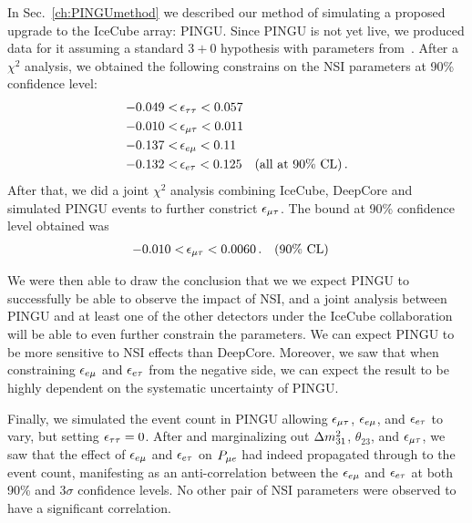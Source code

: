 In Sec.~\ref{ch:PINGUmethod} we described our method of simulating a proposed upgrade to the IceCube array: PINGU.
Since PINGU is not yet live, we produced data for it assuming a standard $3+0$ hypothesis with parameters from~\cite{nufit}.
After a $\chi^2$ analysis, we obtained the following constrains on the NSI parameters at 90\% confidence level:
\begin{align}
    -0.049 <&\, \epsilon_{\tau\tau} < 0.057 \nonumber \\
    -0.010 <&\, \epsilon_{\mu\tau} < 0.011 \nonumber \\
    -0.137 <&\, \epsilon_{e\mu} < 0.11 \nonumber \\
    -0.132 <&\, \epsilon_{e\tau} < 0.125 \quad (\text{all at }90\% \text{ CL})\,.
 \end{align}
After that, we did a joint $\chi^2$ analysis combining IceCube, DeepCore and simulated PINGU events to further constrict $\epsilon_{\mu\tau}$. The bound at 90\% confidence level obtained was
\begin{align}
    -0.010 <&\, \epsilon_{\mu\tau} < 0.0060\,. \quad (90\% \text{ CL})
 \end{align}

We were then able to draw the conclusion that we we expect PINGU to successfully be able to observe the impact of NSI, and a joint analysis between PINGU and at least one of the other detectors under the IceCube collaboration
will be able to even further constrain the parameters. We can expect PINGU to be more sensitive to NSI effects than DeepCore. Moreover, we saw that when constraining $\epsilon_{e\mu}$ and $\epsilon_{e\tau}$ from the negative side, 
we can expect the result to be highly dependent on the systematic uncertainty of PINGU.

Finally, we simulated the event count in PINGU allowing $\epsilon_{\mu\tau}$, $\epsilon_{e\mu}$, and $\epsilon_{e\tau}$ to vary, but setting $\epsilon_{\tau\tau}=0$.
After and marginalizing out $\dm[31]$, $\theta_{23}$, and $\epsilon_{\mu\tau}$, we saw that the effect of $\epsilon_{e\mu}$ and $\epsilon_{e\tau}$ on $P_{\mu e}$ had indeed propagated through to the event count,
manifesting as an anti-correlation between the $\epsilon_{e\mu}$ and $\epsilon_{e\tau}$ at both 90\% and $3\sigma$ confidence levels. No other pair of NSI parameters were observed to have 
a significant correlation.